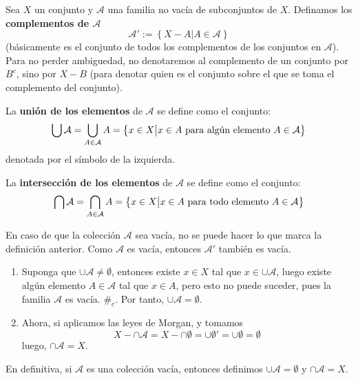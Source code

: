 \documentclass[12pt]{report}
\theoremstyle{largebreak}
\newcommand\contradiction{\ensuremath{\#_c}}
\begin{document}
    \begin{mydef}
        Sea $X$ un conjunto y $\mathcal{A}$ una familia no vacía de subconjuntos de $X$. Definamos los \textbf{complementos de $\mathcal{A}$}
        \begin{equation*}
            \mathcal{A}':=\left\{X-A\big| A\in\mathcal{A} \right\}
        \end{equation*}
        (básicamente es el conjunto de todos los complementos de los conjuntos en $\mathcal{A}$). Para no perder ambiguedad, no denotaremos al complemento de un conjunto por $B^c$, sino por $X-B$ (para denotar quien es el conjunto sobre el que se toma el complemento del conjunto).

        La \textbf{unión de los elementos} de $\mathcal{A}$ se define como el conjunto:
        \begin{equation*}
            \bigcup\mathcal{A}=\bigcup_{A\in\mathcal{A}}A=\left\{x\in X\big| x\in A\textup{ para algún elemento }A\in\mathcal{A} \right\}
        \end{equation*}
        denotada por el símbolo de la izquierda.

        La \textbf{intersección de los elementos} de $\mathcal{A}$ se define como el conjunto:
        \begin{equation*}
            \bigcap\mathcal{A}=\bigcap_{A\in\mathcal{A}}A=\left\{x\in X\big| x\in A\textup{ para todo elemento }A\in\mathcal{A} \right\}
        \end{equation*}
    \end{mydef}

    \begin{obs}
        En caso de que la colección $\mathcal{A}$ sea vacía, no se puede hacer lo que marca la definición anterior. Como $\mathcal{A}$ es vacía, entonces $\mathcal{A}'$ también es vacía.
        \begin{enumerate}
            \item Suponga que $\cup\mathcal{A}\neq\emptyset$, entonces existe $x\in X$ tal que $x\in \cup\mathcal{A}$, luego existe algún elemento $A\in\mathcal{A}$ tal que $x\in A$, pero esto no puede suceder, pues la familia $\mathcal{A}$ es vacía. \contradiction. Por tanto, $\cup\mathcal{A}=\emptyset$.
            \item Ahora, si aplicamos las leyes de Morgan, y tomamos
            \begin{equation*}
                X-\cap\mathcal{A}=X-\cap\emptyset=\cup\emptyset'=\cup\emptyset=\emptyset
            \end{equation*}
            luego, $\cap\mathcal{A}=X$.
        \end{enumerate}
        En definitiva, si $\mathcal{A}$ es una colección vacía, entonces definimos $\cup\mathcal{A}=\emptyset$ y $\cap\mathcal{A}=X$.
    \end{obs}
\end{document}
